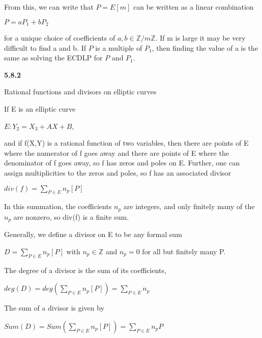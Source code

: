 \documentclass[titlepage]{article}
\begin{document}
From this, we can write that $P=E[m]$ can be written as a linear combination 

\begin{center} 
$P=aP_1 + bP_2$
\end{center} 
 for a unique choice of coefficients of $a,b \in \mathbb{Z}/m\mathbb{Z}$. If m is large it may be very difficult to find a and b. If $P$ is a multiple of $P_1$, then finding the value of a is the same as solving the ECDLP for $P$ and $P_1$. 

\vspace{5mm}

\textbf{5.8.2}

Rational functions and divisors on elliptic curves

If E is an elliptic curve
\begin{center}
$E : Y_2 = X_3 + AX + B$,
\end{center}

and if f(X,Y) is a rational function of two variables, then there are points of E where the numerator of f goes away and there are points of E where the denominator of f goes away, so f has zeros and poles on E. Further, one can assign multiplicities to the zeros and poles, so f has an associated divisor

\begin{center} 
$div(f) = \sum\limits_{P\in E} n_p[P]$
\end{center}

In this summation, the coefficients $n_p$ are integers, and only finitely many of the $n_p$ are nonzero, so div(f) is a finite sum. 

Generally, we define a divisor on E to be any formal sum
\begin{center} 
$D=\sum\limits_{P\in E} n_p[P]$ with $n_p \in \mathbb{Z}$ and $n_p=0$ for all but finitely many P. 

\end{center}
The degree of a divisor is the sum of its coefficients, 

\begin{center} 
$deg(D) = deg(\sum\limits_{P\in E} n_p[P]) = \sum\limits_{P\in E} n_p$

\end{center}

The sum of a divisor is given by

\begin{center} 
$Sum(D) = Sum(\sum\limits_{P\in E} n_p[P]) = \sum\limits_{P\in E} n_pP$

\end{center}
\end{document}
